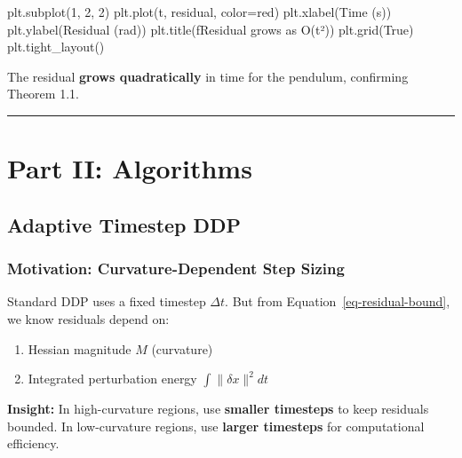 \documentclass[
  letterpaper,
  DIV=11,
  numbers=noendperiod]{scrartcl}
\newenvironment{Shaded}{\begin{snugshade}}{\end{snugshade}}
\newcommand{\DecValTok}[1]{\textcolor[rgb]{0.68,0.00,0.00}{#1}}
\newcommand{\NormalTok}[1]{\textcolor[rgb]{0.00,0.23,0.31}{#1}}
\newcommand{\OperatorTok}[1]{\textcolor[rgb]{0.37,0.37,0.37}{#1}}
\newcommand{\SpecialStringTok}[1]{\textcolor[rgb]{0.13,0.47,0.30}{#1}}
\newcommand{\StringTok}[1]{\textcolor[rgb]{0.13,0.47,0.30}{#1}}
\newcommand{\VariableTok}[1]{\textcolor[rgb]{0.07,0.07,0.07}{#1}}
\providecommand{\tightlist}{%
  \setlength{\itemsep}{0pt}\setlength{\parskip}{0pt}}\usepackage{longtable,booktabs,array}
\begin{document}
\begin{Shaded}
\begin{Highlighting}[]
\NormalTok{plt.subplot(}\DecValTok{1}\NormalTok{, }\DecValTok{2}\NormalTok{, }\DecValTok{2}\NormalTok{)}
\NormalTok{plt.plot(t, residual, color}\OperatorTok{=}\StringTok{\textquotesingle{}red\textquotesingle{}}\NormalTok{)}
\NormalTok{plt.xlabel(}\StringTok{\textquotesingle{}Time (s)\textquotesingle{}}\NormalTok{)}
\NormalTok{plt.ylabel(}\StringTok{\textquotesingle{}Residual (rad)\textquotesingle{}}\NormalTok{)}
\NormalTok{plt.title(}\SpecialStringTok{f\textquotesingle{}Residual grows as O(t²)\textquotesingle{}}\NormalTok{)}
\NormalTok{plt.grid(}\VariableTok{True}\NormalTok{)}
\NormalTok{plt.tight\_layout()}
\end{Highlighting}
\end{Shaded}

The residual \textbf{grows quadratically} in time for the pendulum,
confirming Theorem 1.1.

\begin{center}\rule{0.5\linewidth}{0.5pt}\end{center}

\section{Part II: Algorithms}\label{sec-algorithms}

\subsection{Adaptive Timestep DDP}\label{sec-adaptive-ddp}

\subsubsection{Motivation: Curvature-Dependent Step
Sizing}\label{motivation-curvature-dependent-step-sizing}

Standard DDP uses a fixed timestep \(\Delta t\). But from
Equation~\ref{eq-residual-bound}, we know residuals depend on:

\begin{enumerate}
\def\labelenumi{\arabic{enumi}.}
\tightlist
\item
  Hessian magnitude \(M\) (curvature)
\item
  Integrated perturbation energy \(\int \|\delta x\|^2 dt\)
\end{enumerate}

\textbf{Insight:} In high-curvature regions, use \textbf{smaller
timesteps} to keep residuals bounded. In low-curvature regions, use
\textbf{larger timesteps} for computational efficiency.
\end{document}
